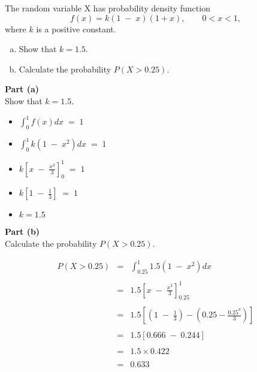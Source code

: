 \documentclass[a4paper,12pt]{article}
\begin{document}
\Large
\noindent  The random variable X has probability density function
\[f ( x ) = k (1 \;-\; x )(1 + x ),
\qquad 0 < x < 1 ,\]
where $k$ is a positive constant.

\begin{enumerate}[(a)]
\item Show that $k = 1.5$.
\item Calculate the probability $P(X > 0.25)$.
\end{enumerate}

\newpage

\begin{framed}
\noindent \textbf{Part (a)} \\
Show that $k = 1.5$.
\end{framed}

\begin{itemize}

\item ${ \displaystyle  \int^{1}_{0} f(x) dx \;=\; 1 }$

\item ${ \displaystyle  \int^{1}_{0} k (1 \;-\; x^2 ) dx \;=\; 1 }$ 


\item ${ \displaystyle k \left[ x \;-\; \frac{x^3}{3} \right]^{1}_{0}  \;=\; 1 }$ 

\item ${ \displaystyle k \left[ 1 \;-\; \frac{1}{3} \right]  \;=\; 1 }$ 


\item $k = 1.5$

\end{itemize}
\newpage

\begin{framed}
\noindent \textbf{Part (b)} \\
Calculate the probability $P(X > 0.25)$.
\end{framed}

\begin{eqnarray*}
P ( X > 0.25) &=& \int^{1}_{0.25} 1.5 (1 \;-\; x^2 ) dx \\
& & \\
&=& 1.5 \left[ x \;-\; \frac{x^3}{3} \right]^{1}_{0.25}  \\
& & \\
&=& 1.5 \left[  \left( 1 \;-\; \frac{1}{3} \right) -\left( 0.25 - \frac{0.25^3}{3} \right) \right]  \\
& & \\
&=& 1.5 \left[  0.666 \;-\; 0.244 \right]  \\
& & \\
&=& 1.5 \times 0.422 \\
& & \\
&=& 0.633 \\
\end{eqnarray*}
\end{document}

